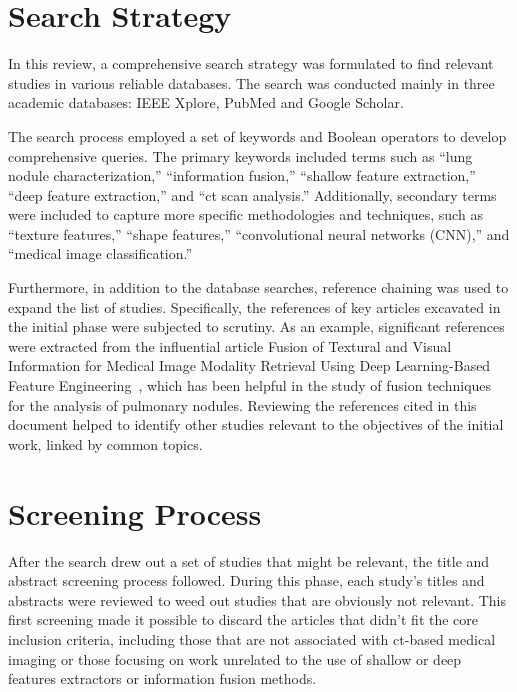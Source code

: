 \section{Search Strategy}

In this review, a comprehensive search strategy was formulated to find relevant studies in various reliable databases. The search was conducted mainly in three academic databases: IEEE Xplore, PubMed and Google Scholar.

The search process employed a set of keywords and Boolean operators to develop comprehensive queries. The primary keywords included terms such as “lung nodule characterization,” “information fusion,” “shallow feature extraction,” “deep feature extraction,” and “\ac{ct} scan analysis.” Additionally, secondary terms were included to capture more specific methodologies and techniques, such as “texture features,” “shape features,” “convolutional neural networks (CNN),” and “medical image classification.”

Furthermore, in addition to the database searches, reference chaining was used to expand the list of studies. Specifically, the references of key articles excavated in the initial phase were subjected to scrutiny. As an example, significant references were extracted from the influential article Fusion of Textural and Visual Information for Medical Image Modality Retrieval Using Deep Learning-Based Feature Engineering~\cite{iqbal_fusion_2023}, which has been helpful in the study of fusion techniques for the analysis of pulmonary nodules. Reviewing the references cited in this document helped to identify other studies relevant to the objectives of the initial work, linked by common topics.



\section{Screening Process}

After the search drew out a set of studies that might be relevant, the title and abstract screening process followed. During this phase, each study's titles and abstracts were reviewed to weed out studies that are obviously not relevant. This first screening made it possible to discard the articles that didn't fit the core inclusion criteria, including those that are not associated with \ac{ct}-based medical imaging or those focusing on work unrelated to the use of shallow or deep features extractors or information fusion methods.

